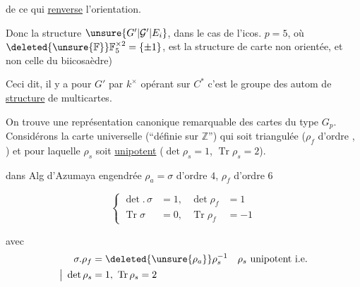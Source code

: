 de ce qui \uline{renverse} l'orientation. 

Donc la structure $\unsure{G'|\mathcal G'|E_i}$, dans le cas de l'icos. $p=5$, où $\deleted{\unsure{\mathbb F}}\mathbb F_5^{\times2}=\{\pm1\}$, est la structure de carte  non orientée, et non celle du biicosaèdre)


Ceci dit, il y a  pour $G'$ par $k^\times$ opérant sur $C^*$ c'est le groupe des autom de  \uline{structure} de multicartes.

On trouve une représentation  canonique remarquable des cartes du type $G_p$.  Considérons la carte universelle (``définie sur $\mathbb Z$'') qui soit triangulée ($\rho_f$ d'ordre , ) et pour laquelle $\rho_s$ soit \uline{unipotent} ($\det\rho_s=1$, $\operatorname{Tr}\rho_s=2$).

dans Alg d'Azumaya engendrée  $\rho_a=\sigma$ d'ordre $4$, $\rho_f$ d'ordre $6$

\[
\left\{\begin{aligned}
\det.\,\sigma&=1,&\det\rho_f&=1\\
\operatorname{Tr}\sigma&=0,&\operatorname{Tr}\rho_f&=-1
\end{aligned}\right.
\]

avec
\[
\begin{aligned}
\sigma.\rho_f&=\deleted{\unsure{\rho_a}}\rho_s^{-1} & \rho_s\ \text{unipotent i.e.}\\
\big\vert\ \det\rho_s&=1,\ \operatorname{Tr}\rho_s=2
\end{aligned}
\]

